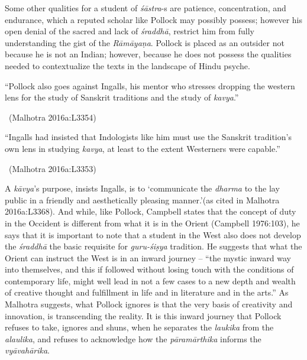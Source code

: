 Some other qualities for a student of \textit{śāstra}-s are patience, concentration, and endurance, which a reputed scholar like Pollock may possibly possess; however his open denial of the sacred and lack of \textit{śraddhā}, restrict him from fully understanding the gist of the \textit{Rāmāyaṇa}. Pollock is placed as an outsider not because he is not an Indian; however, because he does not possess the qualities needed to contextualize the texts in the landscape of Hindu psyche.

\newpage

\begin{myquote}
“Pollock also goes against Ingalls, his mentor who stresses dropping the western lens for the study of Sanskrit traditions and the study of \textit{kavya}.” 

~\hfill (Malhotra 2016a:L3354)
\end{myquote}

\begin{myquote}
“Ingalls had insisted that Indologists like him must use the Sanskrit tradition’s own lens in studying \textit{kavya}, at least to the extent Westerners were capable.” 

\vskip -7pt

~\hfill (Malhotra 2016a:L3353)
\end{myquote}

A \textit{kāvya}’s purpose, insists Ingalls, is to ‘communicate the \textit{dharma} to the lay public in a friendly and aesthetically pleasing manner.’(as cited in Malhotra 2016a:L3368). And while, like Pollock, Campbell states that the concept of duty in the Occident is different from what it is in the Orient (Campbell 1976:103), he says that it is important to note that a student in the West also does not develop the \textit{śraddhā} the basic requisite for \textit{guru-śiṣya} tradition. He suggests that what the Orient can instruct the West is in an inward journey – “the mystic inward way into themselves, and this if followed without losing touch with the conditions of contemporary life, might well lead in not a few cases to a new depth and wealth of creative thought and fulfillment in life and in literature and in the arts.” As Malhotra suggests, what Pollock ignores is that the very basis of creativity and innovation, is transcending the reality. It is this inward journey that Pollock refuses to take, ignores and shuns, when he separates the \textit{laukika} from the \textit{alaulika}, and refuses to acknowledge how the \textit{pāramārthika} informs the \textit{vyāvahārika}.

